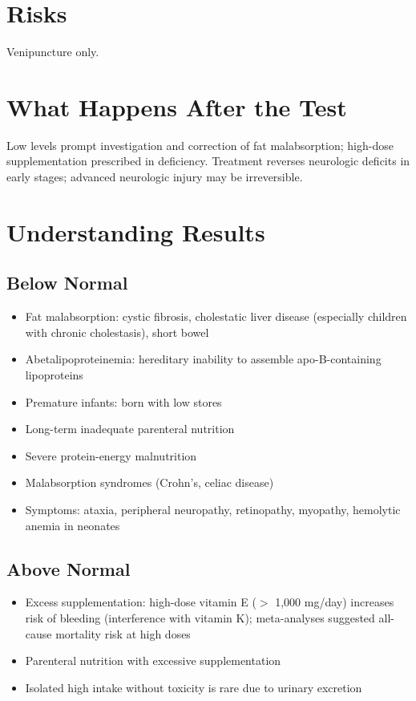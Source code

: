 \section*{Risks}
Venipuncture only.

\section*{What Happens After the Test}
Low levels prompt investigation and correction of fat malabsorption; high-dose supplementation prescribed in deficiency. Treatment reverses neurologic deficits in early stages; advanced neurologic injury may be irreversible.

\section*{Understanding Results}

\subsection*{Below Normal}
\begin{itemize}
  \item Fat malabsorption: cystic fibrosis, cholestatic liver disease (especially children with chronic cholestasis), short bowel
  \item Abetalipoproteinemia: hereditary inability to assemble apo-B-containing lipoproteins
  \item Premature infants: born with low stores
  \item Long-term inadequate parenteral nutrition
  \item Severe protein-energy malnutrition
  \item Malabsorption syndromes (Crohn's, celiac disease)
  \item Symptoms: ataxia, peripheral neuropathy, retinopathy, myopathy, hemolytic anemia in neonates
\end{itemize}

\subsection*{Above Normal}
\begin{itemize}
  \item Excess supplementation: high-dose vitamin E ($>$ 1,000 mg/day) increases risk of bleeding (interference with vitamin K); meta-analyses suggested all-cause mortality risk at high doses
  \item Parenteral nutrition with excessive supplementation
  \item Isolated high intake without toxicity is rare due to urinary excretion
\end{itemize}


